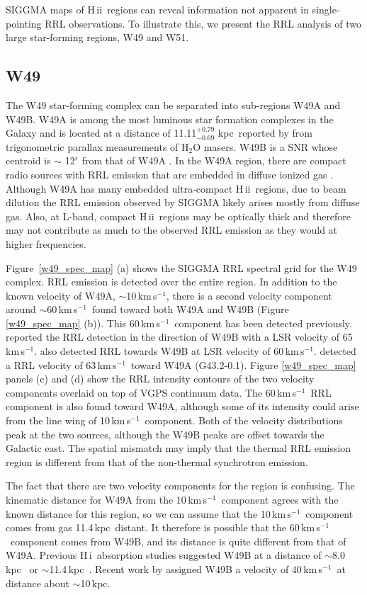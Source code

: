 \documentclass[manuscript]{aastex61}
\newcommand{\hii}{{\rm H\,}{{\sc ii}}}
\newcommand{\hi}{{\rm H\,}{{\sc i}}}
\newcommand{\kms}{\,km\,s$^{-1}$}
\newcommand{\kpc}{\,kpc}
\begin{document}
SIGGMA maps of \hii\ regions can reveal information not apparent in single-pointing RRL observations.  To illustrate this, we present the RRL analysis of two large star-forming regions, W49 and W51.

\subsection{W49}
The W49 star-forming complex can be separated into sub-regions W49A and W49B.
W49A is among the most luminous star formation complexes in the Galaxy and is located at a distance of 11.11$^{+0.79}_{-0.69}$\,\kpc\ reported by \citet{Zhang2013} from trigonometric parallax measurements of H$_{2}$O masers.
W49B is a SNR whose centroid is $\sim$ 12$\mbox{$^\prime$}$ from that of W49A \citep{Lacey2001}.
In the W49A region, there are compact radio sources with RRL emission that are embedded in diffuse ionized gas \citep{Depree1997,Depree2003}.
Although W49A has many embedded ultra-compact \hii\ regions, due to beam dilution the RRL emission observed by SIGGMA likely arises mostly from diffuse gas.
Also, at L-band, compact \hii\ regions may be optically thick and therefore may not contribute as much to the observed RRL emission as they would at higher frequencies.

Figure~\ref{w49_spec_map} (a) shows the SIGGMA RRL spectral grid for the W49 complex.
RRL emission is detected over the entire region.
In addition to the known velocity of W49A, $\sim$10\kms, there is a second velocity component around $\sim$60\kms\ found toward both W49A and W49B (Figure \ref{w49_spec_map} (b)).
This 60\kms\ component has been detected previously.
\citet{Downes1974} reported the RRL detection in the direction of W49B with a LSR velocity of 65\kms.
\citet{Pankonin1975} also detected RRL towards W49B at LSR velocity of 60\kms.
\citet{Anantharamaiah1986} detected a RRL velocity of 63\kms\ toward W49A (G43.2-0.1).
Figure \ref{w49_spec_map} panels (c) and (d) show the RRL intensity contours of the two velocity components overlaid on top of VGPS continuum data.
The 60\kms\ RRL component is also found toward W49A, although some of its intensity could arise from the line wing of 10\kms\ component.
Both of the velocity distributions peak at the two sources, although the W49B peaks are offset towards the Galactic east.
The spatial mismatch may imply that the thermal RRL emission region is different from that of the non-thermal synchrotron emission.

The fact that there are two velocity components for the region is confusing. The kinematic distance for W49A from the 10\kms\ component agrees with the known distance for this region, so we can assume that the 10\kms\ component comes from gas 11.4\kpc\ distant. It therefore is possible that the 60\kms\ component comes from W49B, and its distance is quite different from that of W49A.
Previous \hi\ absorption studies suggested W49B at a distance of $\sim$8.0\kpc\ \citep{Moffett1994} or $\sim$11.4\kpc\ \citep{Brogan2001}.
Recent work by \citet{Zhu2014} assigned W49B a velocity of 40\kms\ at distance about $\sim$10\kpc.
\end{document}
